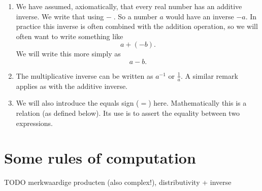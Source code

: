 \begin{enumerate}
\begin{enumerate}
\item The \textbf{closed interval} $[a,b]$ which contains both $a$ and $b$ as well as all the numbers between;
\item The \textbf{open interval} $]a,b[$ which does not contain $a$ or $b$;
\item The \textbf{half-open interval} $[a,b[$ which contains $a$ but not $b$; and
\item The \textbf{half-open interval} $]a,b]$ which contains $b$ but not $a$.
\end{enumerate}
We can also let the interval extend to infinity (always with an open bracket because infinity itself is not a real number). E.g.
\begin{enumerate}
\item $[a, \infty[$ contains all numbers larger or equal to $a$;
\item $]-\infty, a[$ contains all numbers strictly smaller than $a$;
\item $]-\infty, \infty[$ contains all numbers.
\end{enumerate}
\item We have assumed, axiomatically, that every real number has an additive inverse. We write that using $-\;$. So a number $a$ would have an inverse $-a$. In practice this inverse is often combined with the addition operation, so we will often want to write something like
\[ a + (-b). \]
We will write this more simply as
\[ a-b. \]
\item The multiplicative inverse can be written as $a^{-1}$ or $\frac{1}{a}$. A similar remark applies as with the additive inverse.
\item We will also introduce the equals sign ($=$) here. Mathematically this is a relation (as defined below). Its use is to assert the equality between two expressions. 
\end{enumerate}



\chapter{Some rules of computation}
TODO merkwaardige producten (also complex!), distributivity + inverse